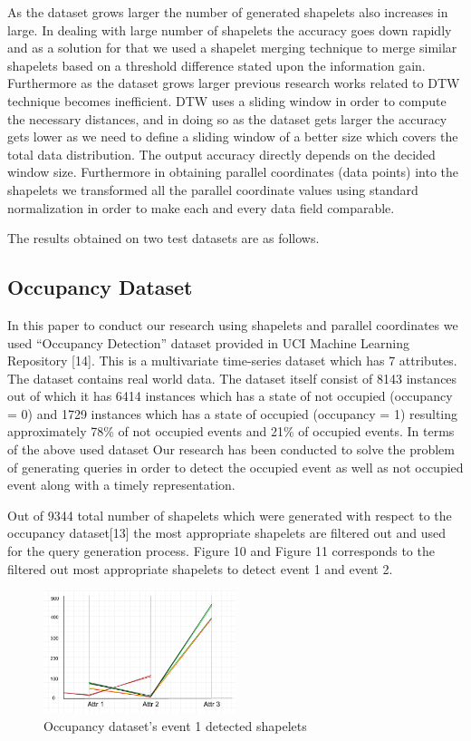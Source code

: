 \documentclass[conference]{IEEEtran}  %
\begin{document}
As the dataset grows larger the number of generated shapelets also increases in large. In dealing with large number of shapelets the accuracy goes down rapidly and as a solution for that we used a shapelet merging technique to merge similar shapelets based on a threshold difference stated upon the information gain. Furthermore as the dataset grows larger previous research works related to DTW technique becomes inefficient. DTW uses a sliding window in order to compute the necessary distances, and in doing so as the dataset gets larger the accuracy gets lower as we need to define a sliding window of a better size which covers the total data distribution. The output accuracy directly depends on the decided window size. Furthermore in obtaining parallel coordinates (data points) into the shapelets we transformed all the parallel coordinate values using standard normalization in order to make each and every data field comparable. 

The results obtained on two test datasets are as follows. 

\subsection{Occupancy Dataset} 
In this paper to conduct our research using shapelets and parallel coordinates we used “Occupancy Detection” dataset provided in UCI Machine Learning Repository [14]. This is a multivariate time-series dataset which has 7 attributes. The dataset contains real world data. The dataset itself consist of 8143 instances out of which it has 6414 instances which has a state of not occupied (occupancy = 0) and 1729 instances which has a state of occupied (occupancy = 1) resulting approximately 78\% of not occupied events and 21\% of occupied events. 
In terms of the above used dataset Our research has been conducted to solve the problem of generating queries in order to detect the occupied event as well as not occupied event along with a timely representation. 

Out of 9344 total number of shapelets which were generated with respect to the occupancy dataset[13] the most appropriate shapelets are filtered out and used for the query generation process. Figure 10 and Figure 11 corresponds to the filtered out most appropriate shapelets to detect event 1 and event 2.


\begin{figure}[h!]
\includegraphics[width=0.5\textwidth]{Occupancy_event1.png}
\caption{Occupancy dataset's event 1 detected shapelets}
\end{figure}
\end{document}
